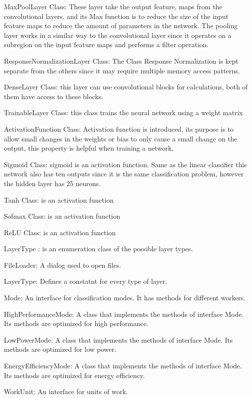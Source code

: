 \documentclass[parskip=full]{scrartcl}
\begin{document}
MaxPoolLayer Class: These layer take the output feature, maps from the convolutional layers, and its Max function is to reduce the size of the input feature maps to reduce the amount of parameters in the network.
The pooling layer works in a similar way to the convolutional layer since it operates on a subregion on the input feature maps and performs a filter operation.

ResponseNormalizationLayer Class: The Class Response Normalization is kept separate from the others since it may require multiple memory access patterns.

DenseLayer Class:  this layer can use convolutional blocks for calculations, both of them have access to these blocks.

TrainableLayer Class: this class trains the neural network using a weight matrix

ActivationFunction Class:  Activation function is introduced, its purpose is to allow small changes in the weights or bias to only cause a small change on the output, this property is helpful when training a network.

Sigmoid Class: sigmoid is an activation function.  Same as the linear classifier this network also has ten outputs since it is the same classification problem, however the hidden layer has 25 neurons.

Tanh Class: is an activation function

Sofmax Class: is an activation function

ReLU Class:  is an activation function

LayerType : is an enumeration class of the possible layer types.




FileLoader: A dialog used to open files.

LayerType: Defines a constatnt for every type of layer.

Mode: An interface for classification modes. It has methods for different workers.

HighPerformanceMode: A class that implements the methods of interface Mode. Its methods are optimized for high performance.

LowPowerMode: A class that implements the methods of interface Mode. Its methods are optimized for low power.

EnergyEfficiencyMode: A class that implements the methods of interface Mode. Its methods are optimized for energy efficiency.

WorkUnit: An interface for units of work.
\end{document}
